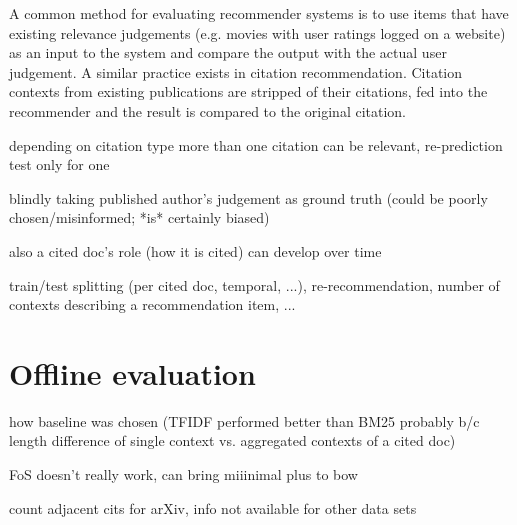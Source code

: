 A common method for evaluating recommender systems is to use items that have existing relevance judgements (e.g. movies with user ratings logged on a website) as an input to the system and compare the output with the actual user judgement. A similar practice exists in citation recommendation. Citation contexts from existing publications are stripped of their citations, fed into the recommender and the result is compared to the original citation. 

depending on citation type more than one citation can be relevant, re-prediction test only for one

blindly taking published author's judgement as ground truth (could be poorly chosen/misinformed; *is* certainly biased)

also a cited doc's role (how it is cited) can develop over time\cite{Swales1986,He2018}


train/test splitting (per cited doc, temporal, ...), re-recommendation, number of contexts describing a recommendation item, ...


\section{Offline evaluation}\label{sec:offeval}

how baseline was chosen (TFIDF performed better than BM25 probably b/c length difference of single context vs. aggregated contexts of a cited doc)

FoS doesn't really work, can bring miiinimal plus to bow

count adjacent cits for arXiv, info not available for other data sets




